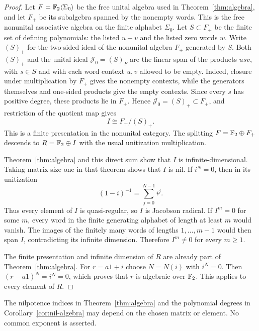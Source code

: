 \begin{proof}
Let $F=\mathbb F_2\langle\Sigma_0\rangle$ be the free unital algebra used in
Theorem~\ref{thm:algebra}, and let $F_+$ be its subalgebra spanned by the
nonempty words. This is the free nonunital associative algebra on the finite
alphabet $\Sigma_0$. Let $S\subset F_+$ be the finite set of defining
polynomials: the listed $u-v$ and the listed zero words $w$. Write $(S)_+$
for the two-sided ideal of the nonunital algebra $F_+$ generated by $S$.
Both $(S)_+$ and the unital ideal $\mathcal J_0=(S)_F$ are the linear span
of the products $usv$, with $s\in S$ and with each word context $u,v$
allowed to be empty. Indeed, closure under multiplication by $F_+$ gives
the nonempty contexts, while the generators themselves and one-sided
products give the empty contexts. Since every $s$ has positive degree,
these products lie in $F_+$. Hence $\mathcal J_0=(S)_+\subset F_+$, and
restriction of the quotient map gives
\[
 I\cong F_+/(S)_+.
\]
This is a finite presentation in the nonunital category. The splitting
$F=\mathbb F_2\oplus F_+$ descends to $R=\mathbb F_2\oplus I$ with the usual
unitization multiplication.

Theorem~\ref{thm:algebra} and this direct sum show that $I$ is
infinite-dimensional. Taking matrix size one in that theorem shows that
$I$ is nil. If $i^N=0$, then in its unitization
\[
 (1-i)^{-1}=\sum_{j=0}^{N-1}i^j.
\]
Thus every element of $I$ is quasi-regular, so $I$ is Jacobson radical.
If $I^m=0$ for some $m$, every word in the finite generating alphabet of
length at least $m$ would vanish. The images of the finitely many words
of lengths $1,\ldots,m-1$ would then span $I$, contradicting its infinite
dimension. Therefore $I^m\ne0$ for every $m\geq1$.

The finite presentation and infinite dimension of $R$ are already part of
Theorem~\ref{thm:algebra}. For $r=a1+i$ choose $N=N(i)$ with $i^N=0$.
Then $(r-a1)^N=i^N=0$, which proves that $r$ is algebraic over $\mathbb F_2$.
This applies to every element of $R$.
\end{proof}

\begin{remark}
\label{ca:no-uniform-index}
The nilpotence indices in Theorem~\ref{thm:algebra} and the polynomial
degrees in Corollary~\ref{cor:nil-algebra} may depend on the chosen matrix
or element. No common exponent is asserted.
\end{remark}
